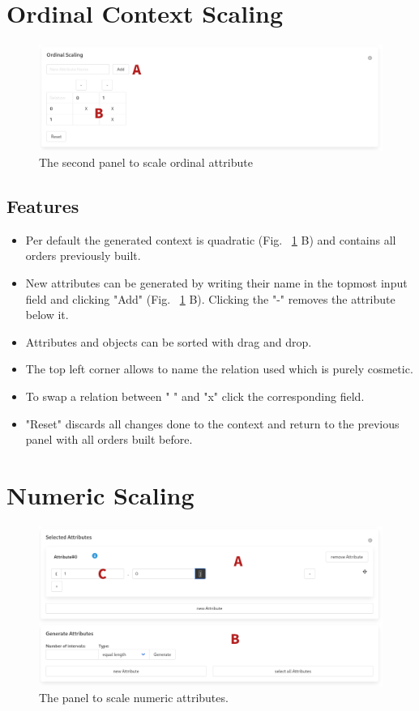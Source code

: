 \documentclass[]{report}
\begin{document}
\section{Ordinal Context Scaling}
\begin{figure}[H]
	\includegraphics[width=\linewidth]{final_presentation/images/ordinal_ctx.png}
	\caption{The second panel to scale ordinal attribute}
	\label{fig:p6}
\end{figure}
\subsection{Features}
\begin{itemize}
    \item Per default the generated context is quadratic (Fig. ~\ref{fig:p6} B) and contains all orders previously built.
    \item New attributes can be generated by writing their name in the topmost input field and clicking "Add" (Fig. ~\ref{fig:p6} B). Clicking the "-" removes the attribute below it.
    \item Attributes and objects can be sorted with drag and drop.
    \item The top left corner allows to name the relation used which is purely cosmetic.
    \item To swap a relation between " " and "x" click the corresponding field.
    \item "Reset" discards all changes done to the context and return to the previous panel with all orders built before.
\end{itemize}

\section{Numeric Scaling}
\begin{figure}[H]
	\includegraphics[width=\linewidth]{final_presentation/images/numeric.png}
	\caption{The panel to scale numeric attributes.}
	\label{fig:p7}
\end{figure}
\end{document}
